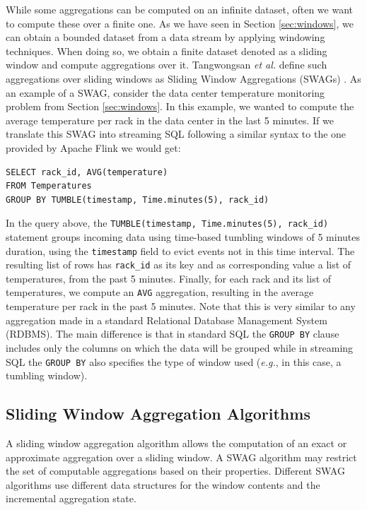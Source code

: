While some aggregations can be computed on an infinite dataset, often we want to compute these over a finite one. As we have seen in Section \ref{sec:windows}, we can obtain a bounded dataset from a data stream by applying windowing techniques. When doing so, we obtain a finite dataset denoted as a sliding window and compute aggregations over it. Tangwongsan \emph{et al.} define such aggregations over sliding windows as Sliding Window Aggregations (SWAGs) \cite{Tangwongsan-Sliding-Window-Aggregation-Algorithms}. As an example of a SWAG, consider the data center temperature monitoring problem from Section \ref{sec:windows}. In this example, we wanted to compute the average temperature per rack in the data center in the last 5 minutes. If we translate this SWAG into streaming SQL following a similar syntax to the one provided by Apache Flink \cite{ApacheFlink} we would get:
\begin{verbatim}
SELECT rack_id, AVG(temperature)
FROM Temperatures
GROUP BY TUMBLE(timestamp, Time.minutes(5), rack_id)
\end{verbatim}
In the query above, the
\texttt{TUMBLE(timestamp, Time.minutes(5), rack\_id)} statement groups incoming data using time-based tumbling windows of 5 minutes duration, using the \texttt{timestamp} field to evict events not in this time interval. The resulting list of rows has \texttt{rack\_id} as its key and as corresponding value a list of temperatures, from the past 5 minutes. Finally, for each rack and its list of temperatures, we compute an \texttt{AVG} aggregation, resulting in the average temperature per rack in the past 5 minutes. Note that this is very similar to any aggregation made in a standard Relational Database Management System (RDBMS). The main difference is that in standard SQL the \texttt{GROUP BY} clause includes only the columns on which the data will be grouped while in streaming SQL the \texttt{GROUP BY} also specifies the type of window used (\textit{e.g.}, in this case, a tumbling window).


\subsection{Sliding Window Aggregation Algorithms} \label{sec:back-swag-algs}

A sliding window aggregation algorithm allows the computation of an exact or approximate aggregation over a sliding window. A SWAG algorithm may restrict the set of computable aggregations based on their properties. Different SWAG algorithms use different data structures for the window contents and the incremental aggregation state.

